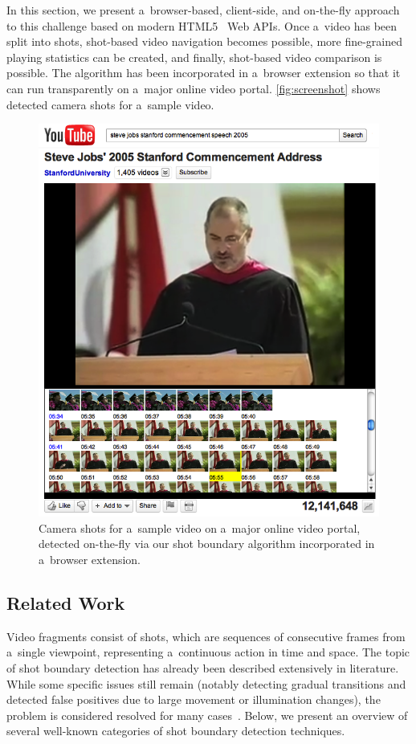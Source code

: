 In this section, we present a~browser-based, client-side, and
on-the-fly approach to this challenge
based on modern HTML5~\cite{berjon2012html5} Web APIs.
Once a~video has been split into shots,
shot-based video navigation becomes possible,
more fine-grained playing statistics can be created,
and finally, shot-based video comparison is possible.
The algorithm has been incorporated in a~browser extension
so that it can run transparently on a~major online video portal.
\autoref{fig:screenshot} shows detected camera
shots for a~sample video.

\begin{figure}
  \begin{center}
    \includegraphics[width=0.7\linewidth]{./stevejobs.png}
  \end{center}
  \caption[Camera shots for a~sample video on  
    a~major online video portal]
    {Camera shots for a~sample video on 
    a~major online video portal, detected on-the-fly via
    our shot boundary algorithm incorporated
    in a~browser extension.}
  \label{fig:screenshot}
\end{figure}

\subsection{Related Work} \label{sec:related-work}
Video fragments consist of shots, which are sequences of
consecutive frames from a~single viewpoint,
representing a~continuous action in time and space.
The topic of shot boundary detection has already been described
extensively in literature.
While some specific issues still remain
(notably detecting gradual transitions and detected false positives
due to large movement or illumination changes),
the problem is considered resolved for many
cases~\cite{yuan2007shotboundary,hanjalic2002shotboundary}.
Below, we present an overview of several well-known categories of shot boundary detection techniques.

